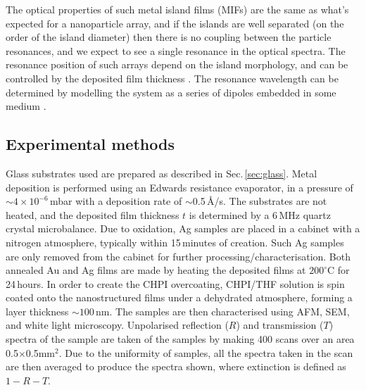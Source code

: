 The optical properties of such metal island films (MIFs) are the same as what's expected for a nanoparticle array, and if the islands are well separated (on the order of the island diameter) then there is no coupling between the particle resonances, and we expect to see a single resonance in the optical spectra. The resonance position of such arrays depend on the island morphology, and can be controlled by the deposited film thickness \cite{Walter2006, Sennett1950, Gupta2002, Gadenne2002, Lee1992}. The resonance wavelength can be determined by modelling the system as a series of dipoles embedded in some medium \cite{Yamaguchi1960, Yamaguchi1972, Yamaguchi1973, Doremus1966}.

\subsection{Experimental methods}
Glass substrates used are prepared as described in Sec.\,\ref{sec:glass}. Metal deposition is performed using an Edwards resistance evaporator, in a pressure of $\sim4\times10^{-6}$\,mbar with a deposition rate of $\sim$0.5\,\AA/s. The substrates are not heated, and the deposited film thickness $t$ is determined by a 6\,MHz quartz crystal microbalance. Due to oxidation, Ag samples are placed in a cabinet with a nitrogen atmosphere, typically within 15\,minutes of creation. Such Ag samples are only removed from the cabinet for further processing/characterisation. Both annealed Au and Ag films are made by heating the deposited films at $200^{\circ}$C for 24\,hours. In order to create the CHPI overcoating, CHPI/THF solution is spin coated onto the nanostructured films under a dehydrated atmosphere, forming a layer thickness $\sim100$\,nm. The samples are then characterised using AFM, SEM, and white light microscopy. Unpolarised reflection ($R$) and transmission ($T$) spectra of the sample are taken of the samples by making 400 scans over an area 0.5$\times$0.5mm$^{2}$. Due to the uniformity of samples, all the spectra taken in the scan are then averaged to produce the spectra shown, where extinction is defined as $1-R-T$.

